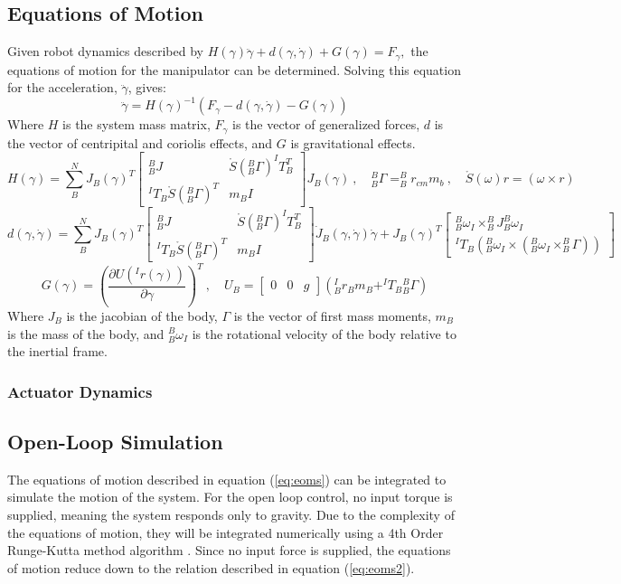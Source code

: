 \subsection{Equations of Motion}
Given robot dynamics described by \(H(\gamma) \ddot{\gamma}+d(\gamma, \dot{\gamma})+G(\gamma)=F_{\gamma},\) the equations of motion for
the manipulator can be determined. Solving this equation for the acceleration, \(\ddot{\gamma}\), gives:
\begin{equation}
  \ddot{\gamma}=H(\gamma)^{-1}\left(F_{\gamma}-d(\gamma, \dot{\gamma})-G(\gamma)\right)
  \label{eq:eoms}
\end{equation}
Where $H$ is the system mass matrix, $F_{\gamma}$ is the vector of generalized forces, $d$ is the vector of centripital and coriolis effects, and $G$ is gravitational effects.
\[
  \renewcommand{\arraystretch}{1.5}
  H(\gamma) = \sum_B^N J_B(\gamma)^T
  \begin{bmatrix}
    ^B_BJ & \mathring{S}(^B_B\Gamma) ^IT_B^T\\
    ^IT_B\mathring{S}(^B_B\Gamma)^T & m_BI
  \end{bmatrix}
  J_B(\gamma)~,\quad
  ^B_B\Gamma = ^B_Br_{cm}m_b~,\quad \mathring{S}(\omega)r=(\omega\times r)
\]
\[
  \renewcommand{\arraystretch}{1.5}
  d(\gamma,\dot{\gamma}) = \sum_B^N J_B(\gamma)^T
  \begin{bmatrix}
    ^B_BJ & \mathring{S}(^B_B\Gamma) ^IT_B^T\\
    ^IT_B\mathring{S}(^B_B\Gamma)^T & m_BI
  \end{bmatrix}
  \dot{J}_B(\gamma,\dot{\gamma})\dot{\gamma}+J_B(\gamma)^T
  \begin{bmatrix}
    ^B_B\omega_I \times ^B_BJ ^B_B\omega_I \\
    ^IT_B\left(^B_B\omega_I\times(^B_B\omega_I\times^B_B\Gamma)\right)
  \end{bmatrix}
\]
\[
G(\gamma) = \left(\frac{\partial U(^Ir(\gamma))}{\partial\gamma}\right)^T~,\quad U_B = \begin{bmatrix} 0 & 0 & g\end{bmatrix}\left(^I_Br_Bm_B + ^IT_B{}_B^B\Gamma\right)
\]
Where $J_B$ is the jacobian of the body, $\Gamma$ is the vector of first mass moments, $m_B$ is the mass of the body, and $^B_B\omega_I$ is the rotational velocity of the body relative to the inertial frame.
\subsubsection{Actuator Dynamics}

\subsection{Open-Loop Simulation}
The equations of motion described in equation (\ref{eq:eoms}) can be integrated to simulate the motion of the system. For the open loop control, no input torque is supplied, meaning the system responds only to gravity. Due to the complexity of the equations of motion, they will be integrated numerically using a 4th Order Runge-Kutta method algorithm \cite{mit}. Since no input force is supplied, the equations of motion reduce down to the relation described in equation (\ref{eq:eoms2}).

